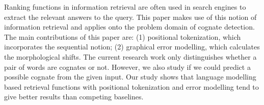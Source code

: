 Ranking functions in information retrieval are often used in search engines to extract the relevant answers to the query. This paper makes use of this notion of information retrieval and applies onto the problem domain of cognate detection. The main contributions of this paper are: (1) positional tokenization, which incorporates the sequential notion; (2) graphical error modelling, which calculates the morphological shifts. The current research work only distinguishes whether a pair of words are cognates or not. However, we also study if we could predict a possible cognate from the given input. Our study shows that language modelling based retrieval functions with positional tokenization and error modelling tend to give better results than competing baselines.
